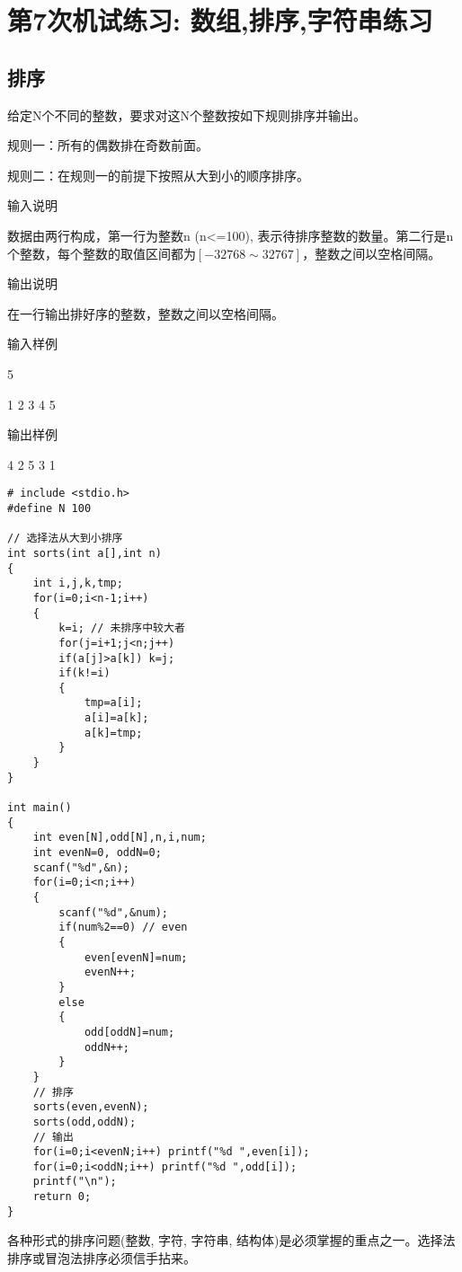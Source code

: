 %
%
%
\chapter{第7次机试练习: 数组,排序,字符串练习}

\section{排序}	
给定N个不同的整数，要求对这N个整数按如下规则排序并输出。

规则一：所有的偶数排在奇数前面。

规则二：在规则一的前提下按照从大到小的顺序排序。

输入说明	

数据由两行构成，第一行为整数n (n<=100), 表示待排序整数的数量。第二行是n个整数，每个整数的取值区间都为$[-32768\sim32767]$，整数之间以空格间隔。

输出说明
	
在一行输出排好序的整数，整数之间以空格间隔。

输入样例	

5 

1 2 3 4 5

输出样例
	
4 2 5 3 1

\begin{lstlisting}
# include <stdio.h>
#define N 100

// 选择法从大到小排序 
int sorts(int a[],int n)
{
	int i,j,k,tmp;
	for(i=0;i<n-1;i++)
	{
		k=i; // 未排序中较大者 
		for(j=i+1;j<n;j++)
		if(a[j]>a[k]) k=j;
		if(k!=i)
		{
			tmp=a[i];
			a[i]=a[k];
			a[k]=tmp;
		} 
	}
}

int main()
{
	int even[N],odd[N],n,i,num;
	int evenN=0, oddN=0;
	scanf("%d",&n);
	for(i=0;i<n;i++)
	{
		scanf("%d",&num);
		if(num%2==0) // even
		{
			even[evenN]=num;
			evenN++;
		}
		else
		{
			odd[oddN]=num;
			oddN++;
		}
	} 
	// 排序
	sorts(even,evenN);
	sorts(odd,oddN);
	// 输出 
	for(i=0;i<evenN;i++) printf("%d ",even[i]); 
	for(i=0;i<oddN;i++) printf("%d ",odd[i]); 
	printf("\n"); 
	return 0;
}
\end{lstlisting}

\begin{note}[要点]
	各种形式的排序问题(整数, 字符, 字符串, 结构体)是必须掌握的重点之一。选择法排序或冒泡法排序必须信手拈来。
\end{note}


